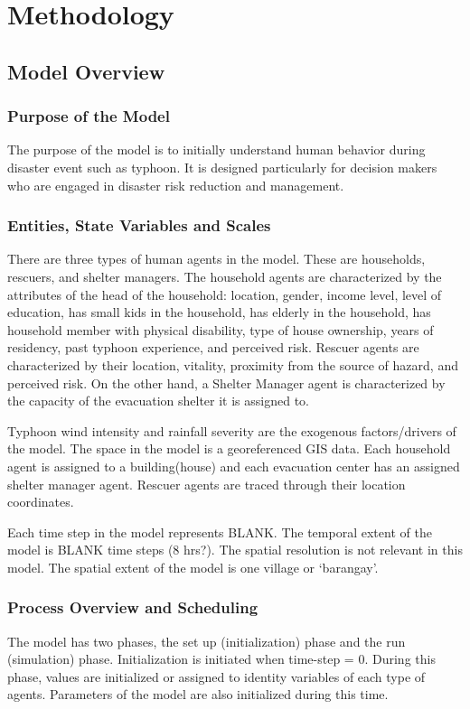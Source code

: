 \documentclass[runningheads]{llncs}
\begin{document}
\section{Methodology}     

\subsection{Model Overview}
\subsubsection{Purpose of the Model}
The purpose of the model is to initially understand human behavior during disaster event such as typhoon. It is designed particularly for decision makers who are engaged in disaster risk reduction and management. 

\subsubsection{Entities, State Variables and Scales}
There are three types of human agents in the model. These are households, rescuers, and shelter managers. The household agents are characterized by the attributes of the head of the household: location, gender, income level, level of education, has small kids in the household, has elderly in the household, has household member with physical disability, type of house ownership, years of residency, past typhoon experience, and perceived risk. Rescuer agents are characterized by their location, vitality, proximity from the source of hazard, and perceived risk. On the other hand, a Shelter Manager agent is characterized by the capacity of the evacuation shelter it is assigned to. 

Typhoon wind intensity and rainfall severity are the exogenous factors/drivers of the model. The space in the model is a georeferenced GIS data. Each household agent is assigned to a building(house) and each evacuation center has an assigned shelter manager agent. Rescuer agents are traced through their location coordinates. 

Each time step in the model represents BLANK. The temporal extent of the model is BLANK time steps (8 hrs?). The spatial resolution is not relevant in this model. The spatial extent of the model is one village or ‘barangay’.

\subsubsection{Process Overview and Scheduling}
The model has two phases, the set up (initialization) phase and the run (simulation) phase. Initialization is initiated when time-step = 0. During this phase, values are initialized or assigned to identity variables of each type of agents. Parameters of the model are also initialized during this time. 
\end{document}
